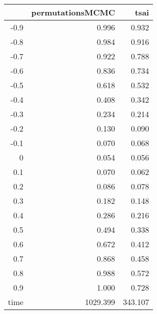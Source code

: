 \begin{table}[ht]
\centering
\begingroup\tiny
\begin{tabular}{rrr}
  \hline
 & permutationsMCMC & tsai \\ 
  \hline
-0.9 & 0.996 & 0.932 \\ 
  -0.8 & 0.984 & 0.916 \\ 
  -0.7 & 0.922 & 0.788 \\ 
  -0.6 & 0.836 & 0.734 \\ 
  -0.5 & 0.618 & 0.532 \\ 
  -0.4 & 0.408 & 0.342 \\ 
  -0.3 & 0.234 & 0.214 \\ 
  -0.2 & 0.130 & 0.090 \\ 
  -0.1 & 0.070 & 0.068 \\ 
  0 & 0.054 & 0.056 \\ 
  0.1 & 0.070 & 0.062 \\ 
  0.2 & 0.086 & 0.078 \\ 
  0.3 & 0.182 & 0.148 \\ 
  0.4 & 0.286 & 0.216 \\ 
  0.5 & 0.494 & 0.338 \\ 
  0.6 & 0.672 & 0.412 \\ 
  0.7 & 0.868 & 0.458 \\ 
  0.8 & 0.988 & 0.572 \\ 
  0.9 & 1.000 & 0.728 \\ 
  time & 1029.399 & 343.107 \\ 
   \hline
\end{tabular}
\endgroup
\end{table}
